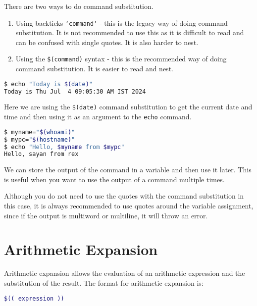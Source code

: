 There are two ways to do command substitution.

\begin{enumerate}
  \item Using backticks \texttt{`command`} - this is the legacy way
    of doing command substitution. It is not recommended to use this
    as it is difficult to read and can be confused with single quotes.
    It is also harder to nest.
  \item Using the \texttt{\$(command)} syntax - this is the recommended
    way of doing command substitution. It is easier to read and nest.
\end{enumerate}


\begin{lstlisting}[language=bash]
$ echo "Today is $(date)"
Today is Thu Jul  4 09:05:30 AM IST 2024
\end{lstlisting}

Here we are using the \texttt{\$(date)} command substitution to get
the current date and time and then using it as an argument to the
\texttt{echo} command.

\begin{lstlisting}[language=bash]
$ myname="$(whoami)"
$ mypc="$(hostname)"
$ echo "Hello, $myname from $mypc"
Hello, sayan from rex
\end{lstlisting}

We can store the output of the command in a variable and then use
it later. This is useful when you want to use the output of a command
multiple times.

\begin{remark}
  Although you do not need to use the quotes with the command substitution
  in this case, it is always recommended to use quotes around the variable
  assignment, since if the output is multiword or multiline, it will
  throw an error.
\end{remark}

\section{Arithmetic Expansion}

Arithmetic expansion allows the evaluation of an arithmetic
expression and the substitution of the result. The format for
arithmetic expansion is:

\begin{lstlisting}[language=bash]
$(( expression ))
\end{lstlisting}

